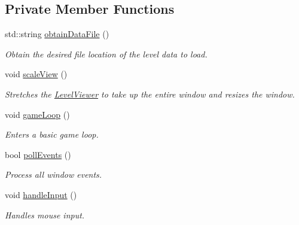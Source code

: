 \subsection*{Private Member Functions}
\begin{DoxyCompactItemize}
\item 
std\+::string \hyperlink{classRRTDemo_abe92fa34990bc750210f44a216773f42}{obtain\+Data\+File} ()
\begin{DoxyCompactList}\small\item\em Obtain the desired file location of the level data to load. \end{DoxyCompactList}\item 
void \hyperlink{classRRTDemo_aadce492558bcddbb1908233676b13c1c}{scale\+View} ()
\begin{DoxyCompactList}\small\item\em Stretches the \hyperlink{classLevelViewer}{Level\+Viewer} to take up the entire window and resizes the window. \end{DoxyCompactList}\item 
void \hyperlink{classRRTDemo_a925d73a53ebf4e1299adecffcf89b953}{game\+Loop} ()
\begin{DoxyCompactList}\small\item\em Enters a basic game loop. \end{DoxyCompactList}\item 
bool \hyperlink{classRRTDemo_ad3b850c9dd02b38f8d5a8d418010a4d2}{poll\+Events} ()
\begin{DoxyCompactList}\small\item\em Process all window events. \end{DoxyCompactList}\item 
void \hyperlink{classRRTDemo_a5273142d4d3b5451e55d3b8609a09dca}{handle\+Input} ()
\begin{DoxyCompactList}\small\item\em Handles mouse input. \end{DoxyCompactList}\end{DoxyCompactItemize}

